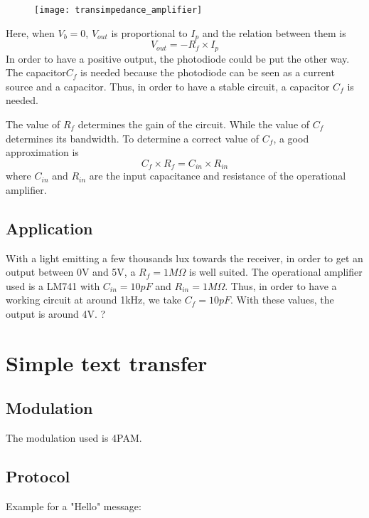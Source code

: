 \documentclass[12pt]{report}
\begin{document}
\begin{figure}[h]
\centering
\texttt{[image: transimpedance\_amplifier]}
\end{figure}

Here, when $V_b = 0$, $V_{out}$ is proportional to $I_p$ and the relation between them is $$V_{out} = - R_f \times I_p$$
In order to have a positive output, the photodiode could be put the other way.
The capacitor$ C_f$ is needed because the photodiode can be seen as a current source and a capacitor. Thus, in order to have a stable circuit, a capacitor $C_f$ is needed.

The value of $R_f$ determines the gain of the circuit. While the value of $C_f$ determines its bandwidth. To determine a correct value of $C_f$, a good approximation is $$C_f \times R_f = C_{in} \times R_{in}$$ where $C_{in}$ and $R_{in}$ are the input capacitance and resistance of the operational amplifier.

\section{Application}

With a light emitting a few thousands lux towards the receiver, in order to get an output between 0V and 5V, a $R_f = 1M\Omega$ is well suited.
 The operational amplifier used is a LM741 with $C_{in} = 10pF$ and $R_{in} = 1M\Omega$. Thus, in order to have a working circuit at around 1kHz, we take $C_f = 10pF$.
With these values, the output is around 4V. ?












\chapter{Simple text transfer}

\section{Modulation}

The modulation used is 4PAM.

\section{Protocol}

Example for a "Hello" message:
\end{document}
